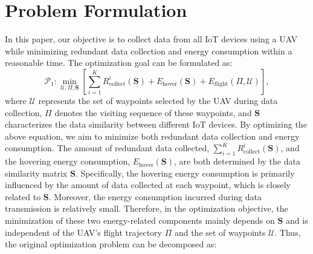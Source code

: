 \documentclass[sigconf]{acmart}
\begin{document}
\section{Problem Formulation}
In this paper, our objective is to collect data from all IoT devices using a UAV while minimizing redundant data collection and energy consumption within a reasonable time. The optimization goal can be formulated as:
\begin{equation}
    \mathcal{P}_1:\min_{\mathcal{U},\Pi,\mathbf{S}} \left[\sum_{i=1}^K R_{\mathrm{collect}}^i(\mathbf{S}) + E_{\mathrm{hover}}(\mathbf{S}) + E_{\mathrm{flight}}(\Pi,\mathcal{U})\right],
\end{equation}
where $\mathcal{U}$ represents the set of waypoints selected by the UAV during data collection, $\Pi$ denotes the visiting sequence of these waypoints, and $\mathbf{S}$ characterizes the data similarity between different IoT devices. By optimizing the above equation, we aim to minimize both redundant data collection and energy consumption. The amount of redundant data collected, $\sum_{i=1}^K R_{\mathrm{collect}}^i(\mathbf{S})$, and the hovering energy consumption, $E_{\mathrm{hover}}(\mathbf{S})$, are both determined by the data similarity matrix $\mathbf{S}$. Specifically, the hovering energy consumption is primarily influenced by the amount of data collected at each waypoint, which is closely related to $\mathbf{S}$. Moreover, the energy consumption incurred during data transmission is relatively small. Therefore, in the optimization objective, the minimization of these two energy-related components mainly depends on $\mathbf{S}$ and is independent of the UAV's flight trajectory $\Pi$ and the set of waypoints $\mathcal{U}$. Thus, the original optimization problem can be decomposed as:
\end{document}
